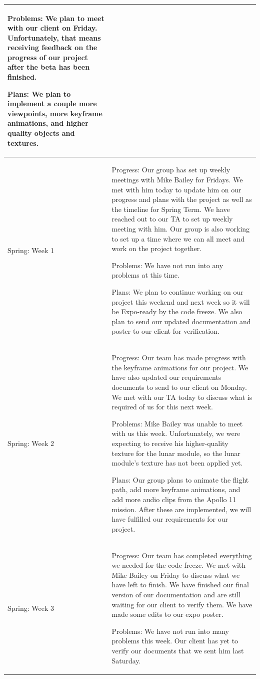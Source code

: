 \documentclass[onecolumn, draftclsnofoot,10pt, compsoc]{IEEEtran}
\begin{document}
\begin{longtable} {|p{1.5cm}|p{13.5cm}|}
Problems: We plan to meet with our client on Friday. Unfortunately, that means receiving feedback on the progress of our project after the beta has been finished.

Plans: We plan to implement a couple more viewpoints, more keyframe animations, and higher quality objects and textures.
\\ \hline

Spring: Week 1 &
Progress: Our group has set up weekly meetings with Mike Bailey for Fridays. We met with him today to update him on our progress and plans with the project as well as the timeline for Spring Term. We have reached out to our TA to set up weekly meeting with him. Our group is also working to set up a time where we can all meet and work on the project together.

Problems: We have not run into any problems at this time.

Plans: We plan to continue working on our project this weekend and next week so it will be Expo-ready by the code freeze. We also plan to send our updated documentation and poster to our client for verification. 
\\ \hline

Spring: Week 2 & 
Progress: Our team has made progress with the keyframe animations for our project. We have also updated our requirements documents to send to our client on Monday. We met with our TA today to discuss what is required of us for this next week.

Problems: Mike Bailey was unable to meet with us this week. Unfortunately, we were expecting to receive his higher-quality texture for the lunar module, so the lunar module's texture has not been applied yet.

Plans: Our group plans to animate the flight path, add more keyframe animations, and add more audio clips from the Apollo 11 mission. After these are implemented, we will have fulfilled our requirements for our project.
\\ \hline

Spring: Week 3 & 
Progress: Our team has completed everything we needed for the code freeze. We met with Mike Bailey on Friday to discuss what we have left to finish. We have finished our final version of our documentation and are still waiting for our client to verify them. We have made some edits to our expo poster.

Problems: We have not run into many problems this week. Our client has yet to verify our documents that we sent him last Saturday.


\end{longtable}
\end{document}
